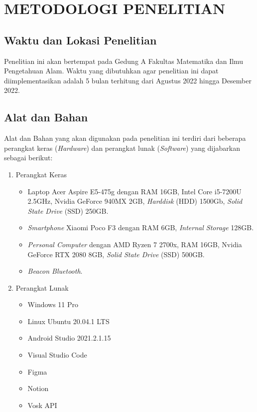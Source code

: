 \fancyhf{} 
\fancyfoot[C]{\thepage}
\chapter{METODOLOGI PENELITIAN}

\section{Waktu dan Lokasi Penelitian}
Penelitian ini akan bertempat pada Gedung A Fakultas Matematika dan Ilmu Pengetahuan Alam. Waktu yang dibutuhkan agar penelitian ini dapat diimplementasikan adalah 5 bulan terhitung dari Agustus 2022 hingga Desember 2022.

\section{Alat dan Bahan}
Alat dan Bahan yang akan digunakan pada penelitian ini terdiri dari beberapa perangkat keras (\textit{Hardware}) dan perangkat lunak (\textit{Software}) yang dijabarkan sebagai berikut:

\begin{enumerate}
\item Perangkat Keras
	\begin{itemize}
	\item Laptop Acer Aspire E5-475g dengan RAM 16GB, Intel Core i5-7200U 2.5GHz, Nvidia GeForce 940MX 2GB, \textit{Harddisk} (HDD) 1500Gb, \textit{Solid State Drive} (SSD) 250GB.
	\item \textit{Smartphone} Xiaomi Poco F3 dengan RAM 6GB, \textit{Internal Storage} 128GB.
	\item \textit{Personal Computer} dengan AMD Ryzen 7 2700x, RAM 16GB, Nvidia GeForce RTX 2080 8GB, \textit{Solid State Drive} (SSD) 500GB.
	\item \textit{Beacon Bluetooth}.
	\end{itemize}

\item Perangkat Lunak
	\begin{itemize}
	\item Windows 11 Pro
	\item Linux Ubuntu 20.04.1 LTS
	\item Android Studio 2021.2.1.15
	\item Visual Studio Code
	\item Figma
	\item Notion
	\item Vosk API
	
	\end{itemize}
\end{enumerate}


